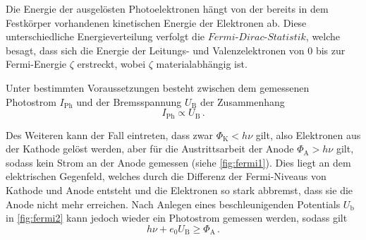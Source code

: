 Die Energie der ausgelösten Photoelektronen hängt von der bereits in dem Festkörper vorhandenen kinetischen Energie der Elektronen ab.
Diese unterschiedliche Energieverteilung verfolgt die $\textit{Fermi-Dirac-Statistik}$, welche besagt,
dass sich die Energie der Leitungs- und Valenzelektronen von 0 bis zur Fermi-Energie $\zeta$ erstreckt, 
wobei $\zeta$ materialabhängig ist.

Unter bestimmten Voraussetzungen besteht zwischen dem gemessenen Photostrom $I_\text{Ph}$
und der Bremsspannung $U_\text{B}$ der Zusammenhang
\begin{equation*}
    I_\text{Ph} \propto U_\text{B} \, .
\end{equation*}

Des Weiteren kann der Fall eintreten, dass zwar $\Phi_\text{K} < h \nu$ gilt, 
also Elektronen aus der Kathode gelöst werden, 
aber für die Austrittsarbeit der Anode $\Phi_\text{A} > h \nu$ gilt, 
sodass kein Strom an der Anode gemessen (siehe \autoref{fig:fermi1}).
Dies liegt an dem elektrischen Gegenfeld, welches durch die Differenz der
Fermi-Niveaus von Kathode und Anode entsteht und die Elektronen so stark abbremst, 
dass sie die Anode nicht mehr erreichen.
Nach Anlegen eines beschleunigenden Potentials $U_\text{b}$ in \autoref{fig:fermi2}
kann jedoch wieder ein Photostrom gemessen werden, sodass gilt
\begin{equation}
    h \nu + e_{0} U_\text{B} \geq \Phi_\text{A} \, .    \label{eq:beschleunigendes_Potential}
\end{equation}

